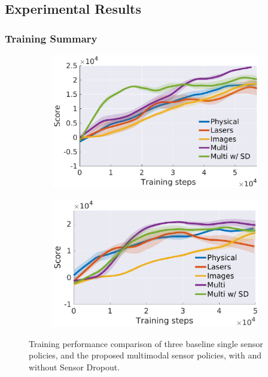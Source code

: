 \documentclass[../thesis.tex]{subfiles}
\begin{document}
 
\subsection{Experimental Results} %
\subsubsection{Training Summary}
 
\begin{figure}[t]
    \centering
    \begin{subfigure}[b]{0.48\linewidth}
        \includegraphics[width=\columnwidth]{./MultimodalDRL/fig/training_step_naf_without_aux}
        \label{fig:training_exp_naf}
    \end{subfigure}
    \begin{subfigure}[b]{0.48\linewidth}
        \includegraphics[width=\columnwidth]{./MultimodalDRL/fig/training_step_ddpg_without_aux}
        \label{fig:training_exp_ddpg}
    \end{subfigure}
    \caption{Training performance comparison of three baseline single sensor policies, and the proposed multimodal sensor policies, with and without Sensor Dropout.}
    \label{fig:training_exp}
\end{figure}
 
\end{document}
